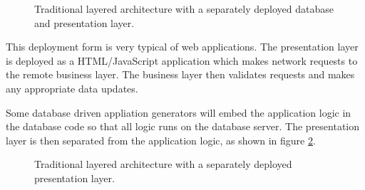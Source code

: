\begin{figure}[ht]
    \centering
    \caption{Traditional layered architecture with a separately deployed database and presentation layer.}
    \label{fig:layered-db-pres-separated}
\end{figure}

This deployment form is very typical of web applications.
The presentation layer is deployed as a \mbox{HTML/}JavaScript application which makes network requests to the remote business layer.
The business layer then validates requests and makes any appropriate data updates.

Some database driven appliation generators will embed the application logic in the database code
so that all logic runs on the database server.
The presentation layer is then separated from the application logic,
as shown in figure \ref{fig:layered-pres-separated}.

\begin{figure}[ht]
    \centering
    \caption{Traditional layered architecture with a separately deployed presentation layer.}
    \label{fig:layered-pres-separated}
\end{figure}

